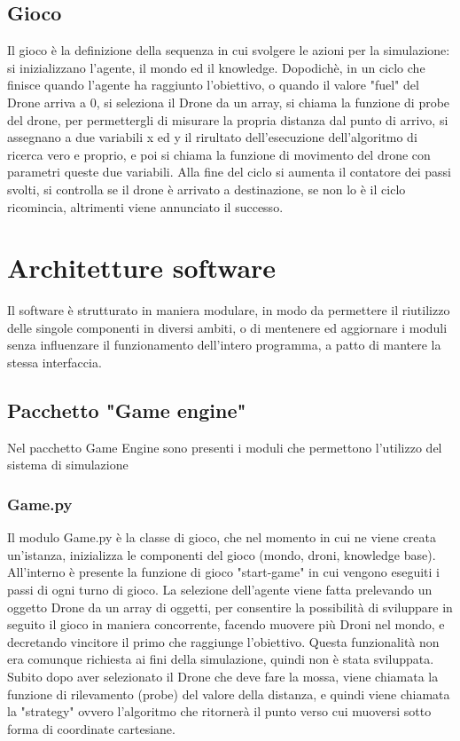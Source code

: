 \subsection{Gioco}
Il gioco è la definizione della sequenza in cui svolgere le azioni per la simulazione: si inizializzano l'agente, il mondo ed il knowledge. Dopodichè, in un ciclo che finisce quando l'agente ha raggiunto l'obiettivo, o quando il valore "fuel" del Drone arriva a 0, si seleziona il Drone da un array, si chiama la funzione di probe del drone, per permettergli di misurare la propria distanza dal punto di arrivo, si assegnano a due variabili x ed y il rirultato dell'esecuzione dell'algoritmo di ricerca vero e proprio, e poi si chiama la funzione di movimento del drone con parametri queste due variabili. Alla fine del ciclo si aumenta il contatore dei passi svolti, si controlla se il drone è arrivato a destinazione, se non lo è il ciclo ricomincia, altrimenti viene annunciato il successo.

	
\section{Architetture software}
Il software è strutturato in maniera modulare, in modo da permettere il riutilizzo delle singole componenti in diversi ambiti, o di mentenere ed aggiornare i moduli senza influenzare il funzionamento dell'intero programma, a patto di mantere la stessa interfaccia.

\subsection{Pacchetto "Game engine"}
Nel pacchetto Game Engine sono presenti i moduli che permettono l'utilizzo del sistema di simulazione

\subsubsection{Game.py}
Il modulo Game.py è la classe di gioco, che nel momento in cui ne viene creata un'istanza, inizializza le componenti del gioco (mondo, droni, knowledge base). All'interno è presente la funzione di gioco "start-game" in cui vengono eseguiti i passi di ogni turno di gioco. La selezione dell'agente viene fatta prelevando un oggetto Drone da un array di oggetti, per consentire la possibilità di sviluppare in seguito il gioco in maniera concorrente, facendo muovere più Droni nel mondo, e decretando vincitore il primo che raggiunge l'obiettivo. Questa funzionalità non era comunque richiesta ai fini della simulazione, quindi non è stata sviluppata. Subito dopo aver selezionato il Drone che deve fare la mossa, viene chiamata la funzione di rilevamento (probe) del valore della distanza, e quindi viene chiamata la "strategy" ovvero l'algoritmo che ritornerà il punto verso cui muoversi sotto forma di coordinate cartesiane.


